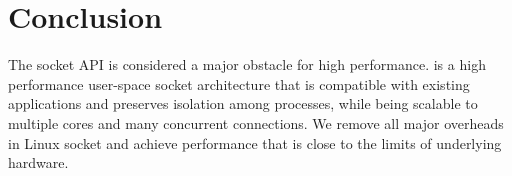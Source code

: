 \section{Conclusion}
\label{sec:conclusion}

The socket API is considered a major obstacle for high performance. \sys is a high performance user-space socket architecture that is compatible with existing applications and preserves isolation among processes, while being scalable to multiple cores and many concurrent connections. We remove all major overheads in Linux socket and achieve performance that is close to the limits of underlying hardware. %
